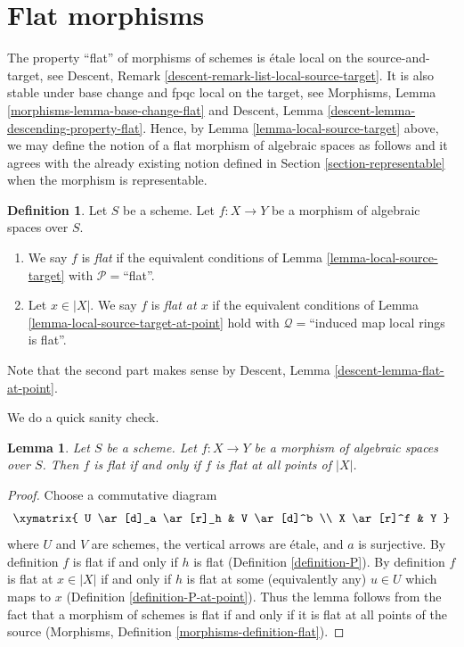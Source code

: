 \documentclass{stacks-project}
\theoremstyle{plain}
\newtheorem{lemma}[subsection]{Lemma}
\theoremstyle{definition}
\newtheorem{definition}[subsection]{Definition}
\theoremstyle{remark}
\numberwithin{equation}{subsection}
\begin{document}
\section{Flat morphisms}
\label{section-flat}

\noindent
The property ``flat'' of morphisms of schemes is
\'etale local on the source-and-target, see
Descent, Remark \ref{descent-remark-list-local-source-target}.
It is also stable under base change and fpqc local on the target, see
Morphisms, Lemma \ref{morphisms-lemma-base-change-flat} and
Descent, Lemma \ref{descent-lemma-descending-property-flat}.
Hence, by
Lemma \ref{lemma-local-source-target}
above, we may define the notion of a flat morphism of algebraic spaces as
follows and it agrees with the already existing notion defined in
Section \ref{section-representable}
when the morphism is representable.

\begin{definition}
\label{definition-flat}
Let $S$ be a scheme.
Let $f : X \to Y$ be a morphism of algebraic spaces over $S$.
\begin{enumerate}
\item We say $f$ is {\it flat} if the equivalent conditions of
Lemma \ref{lemma-local-source-target} with
$\mathcal{P} =$``flat''.
\item Let $x \in |X|$. We say $f$ is {\it flat at $x$} if the
equivalent conditions of
Lemma \ref{lemma-local-source-target-at-point}
hold with $\mathcal{Q} =$``induced map local rings is flat''.
\end{enumerate}
Note that the second part makes sense by
Descent, Lemma \ref{descent-lemma-flat-at-point}.
\end{definition}

\noindent
We do a quick sanity check.

\begin{lemma}
\label{lemma-flat-is-flat-at-all-points}
Let $S$ be a scheme. Let $f : X \to Y$ be a morphism of algebraic spaces
over $S$. Then $f$ is flat if and only if $f$ is flat at all points of $|X|$.
\end{lemma}

\begin{proof}
Choose a commutative diagram
$$
\xymatrix{
U \ar[d]_a \ar[r]_h & V \ar[d]^b \\
X \ar[r]^f & Y
}
$$
where $U$ and $V$ are schemes, the vertical arrows are \'etale, and
$a$ is surjective. By definition $f$ is flat if and only if $h$ is flat
(Definition \ref{definition-P}).
By definition $f$ is flat at $x \in |X|$ if and only if $h$ is flat
at some (equivalently any) $u \in U$ which maps to $x$
(Definition \ref{definition-P-at-point}).
Thus the lemma follows from the fact that a morphism of schemes
is flat if and only if it is flat at all points of the source
(Morphisms, Definition \ref{morphisms-definition-flat}).
\end{proof}
\end{document}
